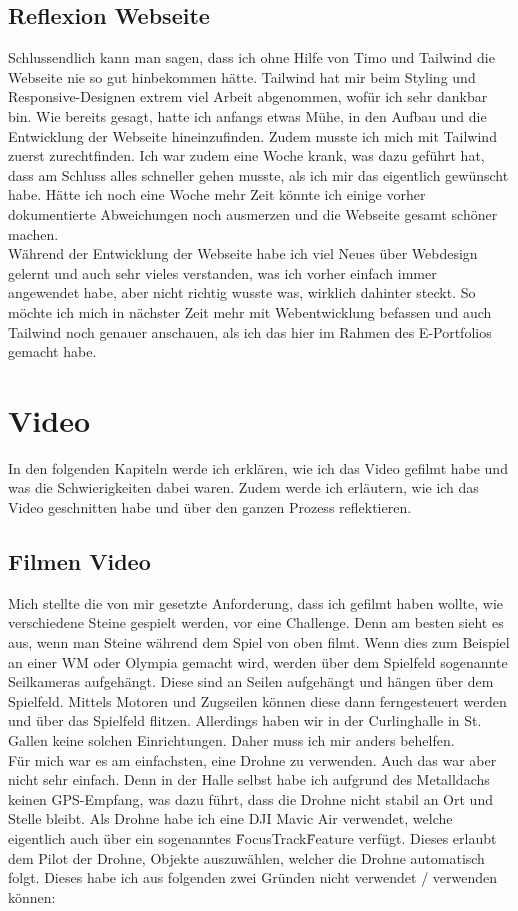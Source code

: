 \documentclass[11pt]{article}
\begin{document}
    \subsection{Reflexion Webseite}
    Schlussendlich kann man sagen, dass ich ohne Hilfe von Timo und Tailwind die Webseite nie so gut hinbekommen hätte. Tailwind hat mir
    beim Styling und Responsive-Designen extrem viel Arbeit abgenommen, wofür ich sehr dankbar bin. Wie bereits gesagt, hatte ich anfangs etwas
    Mühe, in den Aufbau und die Entwicklung der Webseite hineinzufinden. Zudem musste ich mich mit Tailwind zuerst zurechtfinden. Ich war zudem
    eine Woche krank, was dazu geführt hat, dass am Schluss alles schneller gehen musste, als ich mir das eigentlich gewünscht habe. Hätte ich noch
    eine Woche mehr Zeit könnte ich einige vorher dokumentierte Abweichungen noch ausmerzen und die Webseite gesamt schöner machen.\\
    Während der Entwicklung der Webseite habe ich viel Neues über Webdesign gelernt und auch sehr vieles verstanden, was ich vorher einfach
    immer angewendet habe, aber nicht richtig wusste was, wirklich dahinter steckt. So möchte ich mich in nächster Zeit mehr mit Webentwicklung
    befassen und auch Tailwind noch genauer anschauen, als ich das hier im Rahmen des E-Portfolios gemacht habe.

    \pagebreak
    \section{Video}
    In den folgenden Kapiteln werde ich erklären, wie ich das Video gefilmt habe und was die Schwierigkeiten dabei waren. Zudem werde ich
    erläutern, wie ich das Video geschnitten habe und über den ganzen Prozess reflektieren.

    \subsection{Filmen Video}
    Mich stellte die von mir gesetzte Anforderung, dass ich gefilmt haben wollte, wie verschiedene Steine gespielt werden, vor eine Challenge.
    Denn am besten sieht es aus, wenn man Steine während dem Spiel von oben filmt. Wenn dies zum Beispiel an einer WM oder Olympia gemacht wird,
    werden über dem Spielfeld sogenannte Seilkameras aufgehängt. Diese sind an Seilen aufgehängt und hängen über dem Spielfeld. Mittels Motoren
    und Zugseilen können diese dann ferngesteuert werden und über das Spielfeld flitzen. Allerdings haben wir in der Curlinghalle in St. Gallen
    keine solchen Einrichtungen. Daher muss ich mir anders behelfen.\\
    Für mich war es am einfachsten, eine Drohne zu verwenden. Auch das war aber nicht sehr einfach. Denn in der Halle selbst habe ich aufgrund
    des Metalldachs keinen GPS-Empfang, was dazu führt, dass die Drohne nicht stabil an Ort und Stelle bleibt.
    Als Drohne habe ich eine DJI Mavic Air verwendet, welche eigentlich auch über ein sogenanntes \"FocusTrack\" Feature verfügt. Dieses erlaubt dem
    Pilot der Drohne, Objekte auszuwählen, welcher die Drohne automatisch folgt. Dieses habe ich aus folgenden zwei Gründen nicht verwendet
    / verwenden können:
\end{document}
